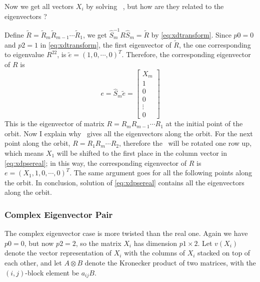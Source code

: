 Now we get all vectors $X_{i}$ by solving \pse\ , but how are they
related to the eigenvectors ?

Define $\tilde{R}=\tilde{R}_{m}\tilde{R}_{m-1}\cdots\tilde{R}_{1}$,
we get
$\hat{S}_{m}^{-1}R\hat{S}_{m}=\tilde{R}$ by \eqref{eq:xdtransform}.
Since $p0=0$ and $p2=1$ in \eqref{eq:xdtransform}, the first
eigenvector of $\tilde{R}$, the one corresponding
 to eigenvalue $R^{22}$, is
$\tilde{e}=(1,0,\cdots , 0)^{T}$. Therefore, the corresponding
eigenvector of $R$ is
\[
e=\hat{S}_{m}\tilde{e}
 = \left[
   \begin{array}{c}
   X_{m} \\
   1    \\
   0 \\
   0\\
   \vdots\\
   0
   \end{array}
 \right]
\]
This is the eigenvector of matrix $R=R_{m}R_{m-1}\cdots R_{1}$ at the
initial point of the orbit. Now I explain why \pse\ gives all
the eigenvectors along the orbit. For the next point along the orbit,
$R=R_{1}R_{m}\cdots R_{2}$, therefore the \pse\ will be rotated one row up,
which means $X_{1}$ will be shifted to the first place in the column
vector in \eqref{eq:xdpsereal}; in this way, the corresponding
eigenvector of $R$ is $e=(X_{1},1,0,\cdots,0)^{T}$. The same
argument goes for all the following points along the orbit. In conclusion,
solution of \eqref{eq:xdpsereal} contains all the eigenvectors along the
orbit.

\subsubsection{Complex Eigenvector Pair}
The complex eigenvector case is more twisted than the real one. Again
we have $p0=0$, but now $p2=2$, so the matrix $X_{i}$  has dimension
$p1\times 2$. Let $v(X_{i})$ denote the vector representation of $X_{i}$
with the columns of $X_{i}$ stacked on top of each other, and let
$A\otimes B$ denote the Kronecker product of two matrices, with the
 $(i,j)$-block element be $a_{ij}B$.

